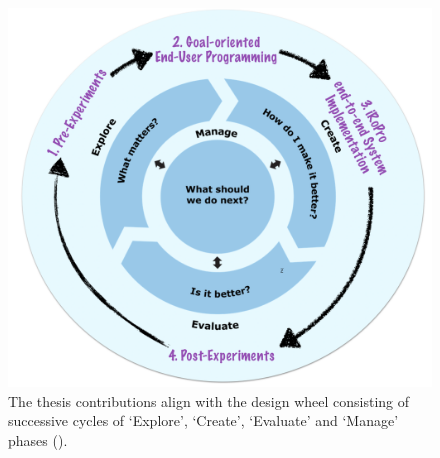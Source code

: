 \begin{figure}[h]
	\centering
	\includegraphics[width=0.83\linewidth]{figures/designwheel}
	\caption{The thesis contributions align with the design wheel consisting of successive cycles of `Explore', `Create', `Evaluate' and `Manage' phases  (\cite{designwheel}).}
	\label{fig:designwheel}
\end{figure}
